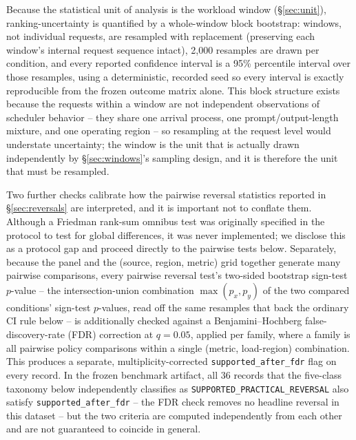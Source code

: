 Because the statistical unit of analysis is the workload window
(\S\ref{sec:unit}), ranking-uncertainty is quantified by a whole-window
block bootstrap: windows, not individual requests, are resampled with
replacement (preserving each window's internal request sequence intact),
2{,}000 resamples are drawn per condition, and every reported confidence
interval is a 95\% percentile interval over those resamples, using a
deterministic, recorded seed so every interval is exactly reproducible from
the frozen outcome matrix alone. This block structure exists because the
requests within a window are not independent observations of scheduler
behavior -- they share one arrival process, one prompt/output-length
mixture, and one operating region -- so resampling at the request level
would understate uncertainty; the window is the unit that is actually
drawn independently by \S\ref{sec:windows}'s sampling design, and it is
therefore the unit that must be resampled.

Two further checks calibrate how the pairwise reversal statistics reported
in \S\ref{sec:reversals} are interpreted, and it is important not to
conflate them. Although a Friedman rank-sum omnibus test was originally
specified in the protocol to test for global differences, it was never
implemented; we disclose this as a protocol gap and proceed directly to
the pairwise tests below.
Separately, because the panel and the (source, region, metric) grid
together generate many pairwise comparisons, every pairwise reversal
test's two-sided bootstrap sign-test $p$-value -- the intersection-union
combination $\max(p_x, p_y)$ of the two compared conditions' sign-test
$p$-values, read off the same resamples that back the ordinary CI rule
below -- is additionally checked against a Benjamini--Hochberg
false-discovery-rate (FDR) correction at $q = 0.05$, applied per family, where a
family is all pairwise policy comparisons within a single (metric,
load-region) combination. This produces a separate, multiplicity-corrected
\texttt{supported\_after\_fdr} flag on every record. In the frozen
benchmark artifact, all $36$ records that the five-class taxonomy below
independently classifies as \texttt{SUPPORTED\_PRACTICAL\_REVERSAL} also
satisfy \texttt{supported\_after\_fdr} -- the FDR check removes no headline
reversal in this dataset -- but the two criteria are computed
independently from each other and are not guaranteed to coincide in
general.

